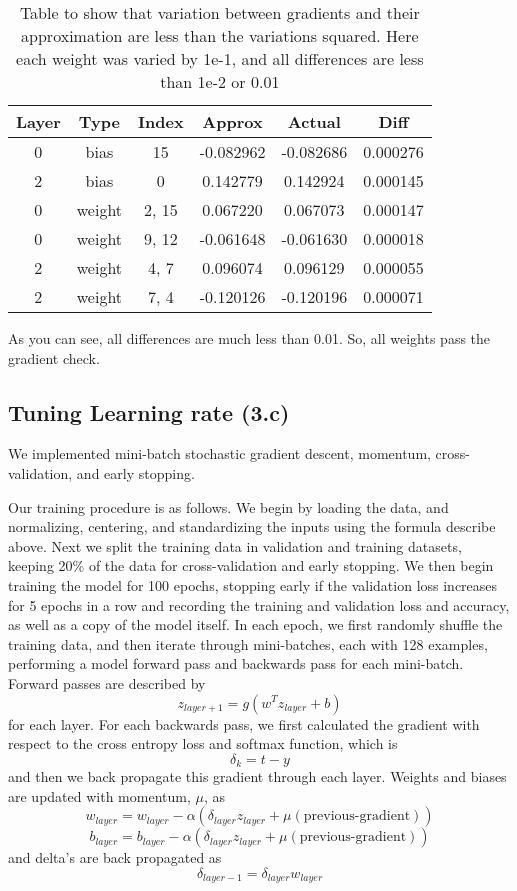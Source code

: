 \documentclass{article} %
\begin{document}
\begin{table}[h!]
\centering
\begin{tabular}{|c c c | c c | c |} 
 \hline
Layer & Type & Index & Approx & Actual & Diff\\ [0.5ex] 
 \hline\hline
 0 & bias & 15 & -0.082962 & -0.082686 & 0.000276 \\ 
 2 & bias & 0 & 0.142779 & 0.142924 & 0.000145\\
 0 & weight & 2, 15 & 0.067220 & 0.067073  & 0.000147\\
 0 & weight & 9, 12 & -0.061648 & -0.061630 & 0.000018 \\
 2 & weight & 4, 7 & 0.096074 & 0.096129 & 0.000055\\ 
 2 & weight & 7, 4 & -0.120126 & -0.120196 & 0.000071\\ 
 \hline
\end{tabular}
\caption{Table to show that variation between gradients and their approximation are less than the variations squared. Here each weight was varied by 1e-1, and all differences are less than 1e-2 or 0.01 }
\label{table:1}
\end{table}

As you can see, all differences are much less than 0.01. So, all weights pass the gradient check.

\subsection{Tuning Learning rate (3.c)} 
We implemented mini-batch stochastic gradient descent, momentum, cross-validation, and early stopping.

Our training procedure is as follows. We begin by loading the data, and normalizing, centering, and standardizing the inputs using the formula describe above. Next we split the training data in validation and training datasets, keeping 20\% of the data for cross-validation and early stopping. We then begin training the model for 100 epochs, stopping early if the validation loss increases for 5 epochs in a row and recording the training and validation loss and accuracy, as well as a copy of the model itself. In each epoch, we first randomly shuffle the training data, and then iterate through mini-batches, each with 128 examples, performing a model forward pass and backwards pass for each mini-batch. Forward passes are described by $$z_{layer+1} = g(w^T z_{layer} + b)$$ for each layer. For each backwards pass, we first calculated the gradient with respect to the cross entropy loss and softmax function, which is
$$\delta_k = t - y$$ and then we back propagate this gradient through each layer. Weights and biases are updated with momentum, $\mu$, as  \\
$$w_{layer} = w_{layer} - \alpha( \delta_{layer} z_{layer} + \mu (\text{previous-gradient}))$$
$$b_{layer} = b_{layer} - \alpha (\delta_{layer} z_{layer} + \mu (\text{previous-gradient}))$$
and delta's are back propagated as 
$$\delta_{layer -1} = \delta_{layer} w_{layer}$$
\end{document}
